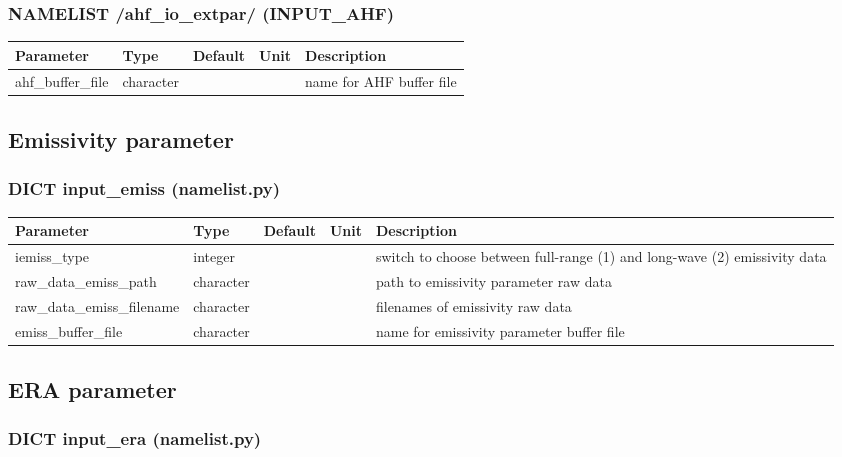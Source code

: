 \documentclass[a4paper,10pt,DIV14,BCOR1cm,titlepage,twoside]{scrartcl}
\providecommand{\tabularnewline}{\\}
\begin{document}
\subsubsection*{NAMELIST /ahf\_io\_extpar/ (INPUT\_AHF)}
\begin{longtable}{|p{4cm}|p{1.5cm}|p{1.5cm}|p{1cm}|p{6cm}|}
\hline 
\textbf{Parameter}& \textbf{Type}& \textbf{Default}& \textbf{Unit}& \textbf{Description}
\tabularnewline
\hline
\endhead
\hline
ahf\_buffer\_file & character & &  & name for AHF buffer file
\tabularnewline
\hline 
\bottomrule
\end{longtable}


\subsection{Emissivity parameter}\label{namelist_input_for_extpar_emissivity}

\subsubsection*{DICT input\_emiss (namelist.py)}

\begin{longtable}{|p{4cm}|p{1.5cm}|p{1.5cm}|p{1cm}|p{6cm}|}
\hline 
\textbf{Parameter}& \textbf{Type}& \textbf{Default}& \textbf{Unit}& \textbf{Description}
\tabularnewline
\hline
\endhead
\hline
iemiss\_type & integer & &  & switch to choose between full-range (1) and long-wave (2) emissivity data \tabularnewline
\hline
raw\_data\_emiss\_path & character & &  & path to emissivity parameter raw data
\tabularnewline
\hline
raw\_data\_emiss\_filename & character & &  &  filenames of emissivity raw data
\tabularnewline
\hline
emiss\_buffer\_file & character & &  & name for emissivity parameter buffer file
\tabularnewline
\hline 
\bottomrule
\end{longtable}

\subsection{ERA parameter}\label{namelist_input_for_extpar_era}

\subsubsection*{DICT input\_era (namelist.py)}
\end{document}
